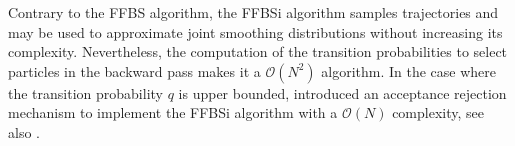 \documentclass[12pt]{article}
\newcommand{\eqsp}{\;}
\newcommand{\1}{\mathrm{1}}
\begin{document}
Contrary to the FFBS algorithm, the FFBSi algorithm samples trajectories and may be used to approximate joint smoothing distributions without increasing its complexity. Nevertheless, the computation of the transition probabilities to select particles in the backward pass makes it a $\mathcal{O}(N^2)$ algorithm. In the case where the transition probability $q$ is upper bounded, \cite{douc:garivier:moulines:olsson:2011} introduced an acceptance rejection mechanism to implement the FFBSi algorithm with a $\mathcal{O}(N)$ complexity, see also \cite{dubarry:lecorff:2011}.
\end{document}

